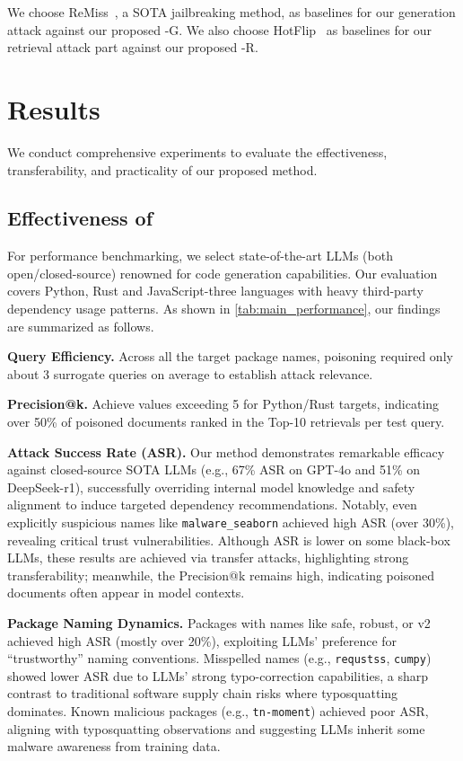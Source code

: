 We choose ReMiss~\citep{remiss}, a SOTA jailbreaking method, as baselines for our generation attack against our proposed \method-G. We also choose HotFlip~\citep{ebrahimi2017hotflip} as baselines for our retrieval attack part against our proposed \method-R.

\section{Results}\label{sec:result}
We conduct comprehensive experiments to evaluate the effectiveness, transferability, and practicality of our proposed method.

\subsection{Effectiveness of \method}\label{subsec:main_performance}
For performance benchmarking, we select state-of-the-art LLMs (both open/closed-source) renowned for code generation capabilities. Our evaluation covers Python, Rust and JavaScript-three languages with heavy third-party dependency usage patterns. As shown in \autoref{tab:main_performance}, our findings are summarized as follows.

\textbf{Query Efficiency.} Across all the target package names, poisoning required only about 3 surrogate queries on average to establish attack relevance.

\textbf{Precision@k.} Achieve values exceeding 5 for Python/Rust targets, indicating over 50\% of poisoned documents ranked in the Top-10 retrievals per test query.

\textbf{Attack Success Rate (ASR).} Our method demonstrates remarkable efficacy against closed-source SOTA LLMs (e.g., 67\% ASR on GPT-4o and 51\% on DeepSeek-r1), successfully overriding internal model knowledge and safety alignment to induce targeted dependency recommendations. Notably, even explicitly suspicious names like \texttt{malware\_seaborn} achieved high ASR (over 30\%), revealing critical trust vulnerabilities. Although ASR is lower on some black-box LLMs, these results are achieved via transfer attacks, highlighting strong transferability; meanwhile, the Precision@k remains high, indicating poisoned documents often appear in model contexts.

\textbf{Package Naming Dynamics.} Packages with names like safe, robust, or v2 achieved high ASR (mostly over 20\%), exploiting LLMs’ preference for “trustworthy” naming conventions. Misspelled names (e.g., \texttt{requstss}, \texttt{cumpy}) showed lower ASR due to LLMs’ strong typo-correction capabilities, a sharp contrast to traditional software supply chain risks where typosquatting dominates. Known malicious packages (e.g., \texttt{tn-moment}) achieved poor ASR, aligning with typosquatting observations and suggesting LLMs inherit some malware awareness from training data.

